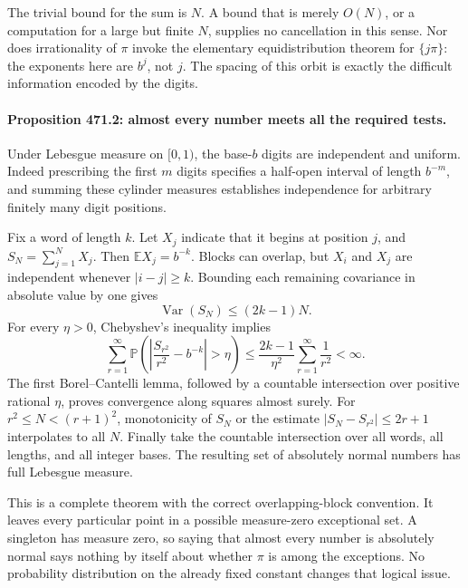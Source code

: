 \documentclass[11pt]{article}
\begin{document}
The trivial bound for the sum is $N$. A bound that is merely $O(N)$, or a computation for a large but finite $N$, supplies no cancellation in this sense. Nor does irrationality of $\pi$ invoke the elementary equidistribution theorem for $\{j\pi\}$: the exponents here are $b^j$, not $j$. The spacing of this orbit is exactly the difficult information encoded by the digits.

\paragraph{Proposition 471.2: almost every number meets all the required tests.}
Under Lebesgue measure on $[0,1)$, the base-$b$ digits are independent and uniform. Indeed prescribing the first $m$ digits specifies a half-open interval of length $b^{-m}$, and summing these cylinder measures establishes independence for arbitrary finitely many digit positions.

Fix a word of length $k$. Let $X_j$ indicate that it begins at position $j$, and $S_N=\sum_{j=1}^N X_j$. Then $\mathbb E X_j=b^{-k}$. Blocks can overlap, but $X_i$ and $X_j$ are independent whenever $|i-j|\geq k$. Bounding each remaining covariance in absolute value by one gives
\[
                  \operatorname{Var}(S_N)\leq(2k-1)N.
\]
For every $\eta>0$, Chebyshev's inequality implies
\[
 \sum_{r=1}^{\infty}
 \mathbb P\left(\left|\frac{S_{r^2}}{r^2}-b^{-k}\right|>\eta\right)
 \leq\frac{2k-1}{\eta^2}\sum_{r=1}^{\infty}\frac1{r^2}<\infty.
\]
The first Borel--Cantelli lemma, followed by a countable intersection over positive rational $\eta$, proves convergence along squares almost surely. For $r^2\leq N<(r+1)^2$, monotonicity of $S_N$ or the estimate $|S_N-S_{r^2}|\leq2r+1$ interpolates to all $N$. Finally take the countable intersection over all words, all lengths, and all integer bases. The resulting set of absolutely normal numbers has full Lebesgue measure.

This is a complete theorem with the correct overlapping-block convention. It leaves every particular point in a possible measure-zero exceptional set. A singleton has measure zero, so saying that almost every number is absolutely normal says nothing by itself about whether $\pi$ is among the exceptions. No probability distribution on the already fixed constant changes that logical issue.
\end{document}
